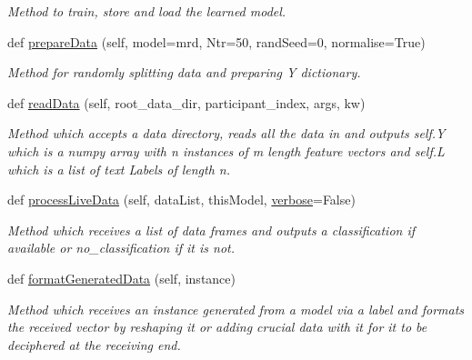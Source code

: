 \begin{DoxyCompactItemize}
\begin{DoxyCompactList}\small\item\em Method to train, store and load the learned model. \end{DoxyCompactList}\item 
def \hyperlink{group__icubclient__SAM__Drivers_ga9e09b2b15fd19eeceef3345c55ffdbdb}{prepare\+Data} (self, model=\textquotesingle{}mrd\textquotesingle{}, Ntr=50, rand\+Seed=0, normalise=True)
\begin{DoxyCompactList}\small\item\em Method for randomly splitting data and preparing Y dictionary. \end{DoxyCompactList}\item 
def \hyperlink{group__icubclient__SAM__Drivers_ga7a55565b0b0f58639327877c4f9cced0}{read\+Data} (self, root\+\_\+data\+\_\+dir, participant\+\_\+index, args, kw)
\begin{DoxyCompactList}\small\item\em Method which accepts a data directory, reads all the data in and outputs self.\+Y which is a numpy array with n instances of m length feature vectors and self.\+L which is a list of text Labels of length n. \end{DoxyCompactList}\item 
def \hyperlink{group__icubclient__SAM__Drivers_gab82c8e473429a812d61a6685428dfc72}{process\+Live\+Data} (self, data\+List, this\+Model, \hyperlink{group__icubclient__SAM__Drivers_ga48cfefc6532ba606936b9fd7f3156da8}{verbose}=False)
\begin{DoxyCompactList}\small\item\em Method which receives a list of data frames and outputs a classification if available or \textquotesingle{}no\+\_\+classification\textquotesingle{} if it is not. \end{DoxyCompactList}\item 
def \hyperlink{group__icubclient__SAM__Drivers_gaac21747b09e36216d09a23bd726cf62d}{format\+Generated\+Data} (self, instance)
\begin{DoxyCompactList}\small\item\em Method which receives an instance generated from a model via a label and formats the received vector by reshaping it or adding crucial data with it for it to be deciphered at the receiving end. \end{DoxyCompactList}\end{DoxyCompactItemize}
